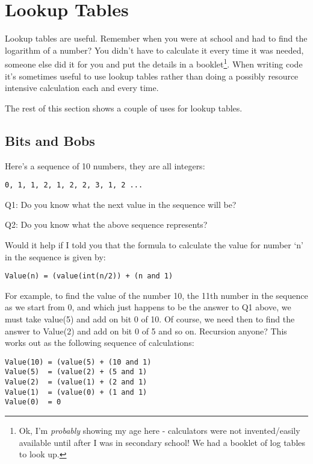 \chapter{Lookup Tables}

Lookup tables are useful. Remember when you were at school and had
to find the logarithm of a number? You didn't have to calculate it
every time it was needed, someone else did it for you and put the
details in a booklet\footnote{Ok, I'm \emph{probably} showing my age here - calculators were not
invented/easily available until after I was in secondary school! We
had a booklet of log tables to look up.}. When writing code it's sometimes useful to use lookup tables rather
than doing a possibly resource intensive calculation each and every
time.

The rest of this section shows a couple of uses for lookup tables. 

\section{Bits and Bobs}

Here's a sequence of 10 numbers, they are all integers:

\begin{lstlisting}[tabsize=4,numbers=none]
0, 1, 1, 2, 1, 2, 2, 3, 1, 2 ...
\end{lstlisting}

Q1: Do you know what the next value in the sequence will be?

Q2: Do you know what the above sequence represents?

Would it help if I told you that the formula to calculate the value
for number `n' in the sequence is given by:

\begin{lstlisting}[numbers=none]
Value(n) = (value(int(n/2)) + (n and 1)
\end{lstlisting}

For example, to find the value of the number 10, the 11th number in
the sequence as we start from 0, and which just happens to be the
answer to Q1 above, we must take value(5) and add on bit 0 of 10.
Of course, we need then to find the answer to Value(2) and add on
bit 0 of 5 and so on. Recursion anyone? This works out as the following
sequence of calculations:

\begin{lstlisting}[numbers=none]
Value(10) = (value(5) + (10 and 1)
Value(5)  = (value(2) + (5 and 1)
Value(2)  = (value(1) + (2 and 1)
Value(1)  = (value(0) + (1 and 1)
Value(0)  = 0
\end{lstlisting}

